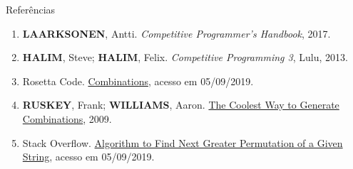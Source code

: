 \begin{frame}[fragile]{Referências}

    \begin{enumerate}
        \item \textbf{LAARKSONEN}, Antti. \textit{Competitive Programmer's Handbook}, 2017.

        \item \textbf{HALIM}, Steve; \textbf{HALIM}, Felix. \textit{Competitive Programming 3}, Lulu, 2013.

        \item Rosetta Code. \href{http://rosettacode.org/wiki/Combinations#C.2B.2B}{Combinations},
            acesso em 05/09/2019.

        \item \textbf{RUSKEY}, Frank; \textbf{WILLIAMS}, Aaron. \href{https://www.semanticscholar.org/paper/The-coolest-way-to-generate-combinations-Ruskey-Williams/546c00847913a5c62feb6dd2d3337ce57c4eefb5}{The Coolest Way to Generate Combinations}, 2009.

        \item Stack Overflow. \href{https://stackoverflow.com/questions/1622532/algorithm-to-find-next-greater-permutation-of-a-given-string}{Algorithm to Find Next Greater Permutation of a Given String}, acesso em 05/09/2019.
    \end{enumerate}

\end{frame}
